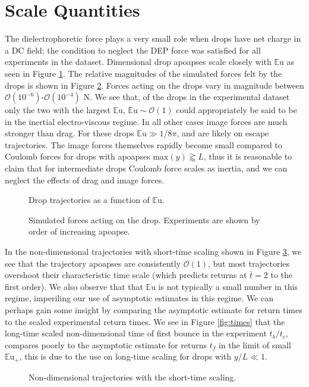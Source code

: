 \documentclass[12pt,a4paper,oneside]{book}
\begin{document}
\section{Scale Quantities}
The dielectrophoretic force plays a very small role when drops have net charge in a DC field; the condition to neglect the DEP force was satisfied for all experiments in the dataset. Dimensional drop apoapses scale closely with $\mathbb{E}\mbox{u}$ as seen in Figure \ref{fig:series_s_eu}. The relative magnitudes of the simulated forces felt by the drops is shown in Figure \ref{fig:forces}. Forces acting on the drops vary in magnitude between $\mathcal{O}(10^{-6})$-$\mathcal{O}(10^{-4})$ N. We see that, of the drops in the experimental dataset only the two with the largest $\mathbb{E}\mbox{u}$, $\mathbb{E}\mbox{u} \sim \mathcal{O}(1)$ could appropriately be said to be in the inertial electro-viscous regime. In all other cases image forces are much stronger than drag. For these drops $\mathbb{E}\mbox{u} \gg 1/8 \pi$, and are likely on escape trajectories. The image forces themselves rapidly become small compared to Coulomb forces for drops with apoapses $\mbox{max}\left( y\right) \gtrapprox L$, thus it is reasonable to claim that for intermediate drops Coulomb force scales as inertia, and we can neglect the effects of drag and image forces.

\begin{figure}[!htb]
    \centering
    
    \caption{Drop trajectories as a function of $\mathbb{E}\mbox{u}$.\label{fig:series_s_eu}}
\end{figure}
\begin{figure}[!htb]
    \centering
    \resizebox{14cm}{!}{}
    \caption{Simulated forces acting on the drop. Experiments are shown by order of increasing apoapse.\label{fig:forces}}
\end{figure}

In the non-dimensional trajectories with short-time scaling shown in Figure \ref{fig:series_s_ds}, we see that the trajectory apoapses are consistently $\mathcal{O}(1)$, but most trajectories overshoot their characteristic time scale (which predicts returns at $\bar{t}  =2$ to the first order). We also observe that that $\mathbb{E}\mbox{u}$ is not typically a small number in this regime, imperiling our use of asymptotic estimates in this regime. We can perhaps gain some insight by comparing the asymptotic estimate for return times to the scaled experimental return times. We see in Figure \ref{fig:times} that the long-time scaled non-dimensional time of first bounce in the experiment $t_b / t_c$, compares poorly to the asymptotic estimate for returns $t_f$ in the limit of small $\mathbb{E}\mbox{u}_+$, this is due to the use on long-time scaling for drops with $y/L \ll 1$.   
\begin{figure}[h]
    \centering
    
    \caption{Non-dimensional trajectories with the short-time scaling.\label{fig:series_s_ds}}
\end{figure}
\end{document}
